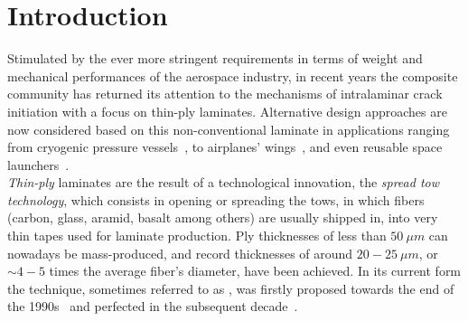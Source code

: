 \documentclass[review]{elsarticle}
\begin{document}
\linenumbers

\section{Introduction}

Stimulated by the ever more stringent requirements in terms of weight and mechanical performances of the aerospace industry, in recent years the composite community has returned its attention to the mechanisms of intralaminar crack initiation with a focus on thin-ply laminates. Alternative design approaches are now considered based on this non-conventional laminate in applications ranging from cryogenic pressure vessels~\cite{McCarville2018}, to airplanes' wings~\cite{Kim2017}, and even reusable space launchers~\cite{Kopp2017}.\\
\emph{Thin-ply} laminates are the result of a technological innovation, the \emph{spread tow technology}, which consists in opening or spreading the tows, in which fibers (carbon, glass, aramid, basalt among others) are usually shipped in, into very thin tapes used for laminate production. Ply thicknesses of less than $50\ \mu m$ can nowadays be mass-produced, and record thicknesses of around $20-25\ \mu m$, or $\sim 4-5$ times the average fiber's diameter, have been achieved. In its current form the technique, sometimes referred to as , was firstly proposed towards the end of the 1990s~\cite{Kawabe1997} and perfected in the subsequent decade~\cite{Kawabe2008,Kawabe2008en}.\\
\end{document}
